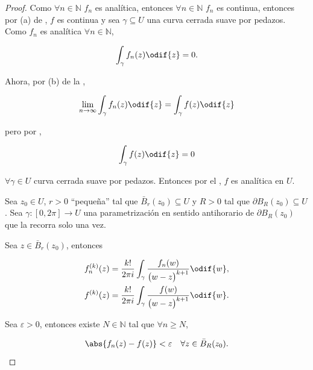 \documentclass[../main.tex]{subfiles}
\begin{document}
\begin{proof}
    Como \(\forall n\in \mathbb{N}\) \(f_{n}\) es analítica, entonces \(\forall n\in
    \mathbb{N}\) \(f_{n}\) es continua, entonces por (a) de
    , \(f\) es
    continua y sea \(\gamma \subseteq U\) una curva cerrada suave por pedazos. Como
    \(f_{n}\) es analítica \(\forall n\in \mathbb{N}\),

    \begin{equation}
        \int_{\gamma}^{}f_{n}(z)\odif{z} = 0.
        \label{eq:curvaCerradaCero}
    \end{equation}

    Ahora, por (b) de la ,

    \begin{equation*}
        \lim_{n \to \infty} \int_{\gamma}^{}f_{n}(z)\odif{z} =
        \int_{\gamma}^{}f(z)\odif{z}
    \end{equation*}

    pero por ,

    \begin{equation*}
        \int_{\gamma}^{}f(z)\odif{z} = 0
    \end{equation*}

    \(\forall \gamma\in U \) curva cerrada suave por pedazos. Entonces por el
    , \(f\) es analítica en
    \(U\).

    Sea \(z_{0}\in  U\), \(r > 0\) ``pequeña'' tal que \(\bar{B}_{r}(z_{0}) \subseteq
    U\) y \(R > 0\) tal que \(\partial B_{R}(z_{0}) \subseteq U\).
    Sea \(\gamma \colon [0, 2\pi] \to U\) una parametrización en sentido antihorario de
    \(\partial B_{R}(z_{0})\) que la recorra solo una vez.

    Sea \( z\in \bar{B}_{r}(z_{0})\), entonces

    \begin{align*}
        f_{n}^{(k)}(z) &= \dfrac{k!}{2\pi i}\int_{\gamma}^{}\dfrac{f_{n}(w)}{\bigl(w -
        z\bigr)^{k + 1}}\odif{w},\\
        f^{(k)}(z) &= \dfrac{k!}{2\pi i}\int_{\gamma}^{}\dfrac{f(w)}{\bigl(w
            - z\bigr)^{k +
        1}}\odif{w}.
    \end{align*}

    Sea \(\varepsilon > 0\), entonces existe \(N\in \mathbb{N}\) tal que
    \(\forall n \geq
    N\),

    \begin{equation*}
        \abs{f_{n}(z) - f(z)} < \varepsilon\quad \forall z\in \bar{B}_{R}(z_{0}).
    \end{equation*}


\end{proof}
\end{document}
